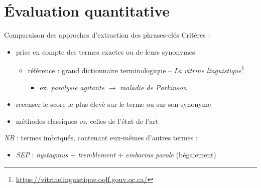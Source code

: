 \documentclass[xcolor={table,usenames,dvipsnames}]{beamer}
\let\olditem\item
\renewcommand{\item}{%
\olditem\vspace{0pt}}
\begin{document}
\section[Évaluation quantitative]{Évaluation quantitative}
\begin{frame}{Comparaison des approches d'extraction des phrases-clés}
	Critères :
	\begin{itemize}
		\item prise en compte des termes exactes ou de leurs synonymes
		\begin{itemize}
			\item référence : grand dictionnaire terminologique -- \textit{La vitrine linguistique}\footnote{\url{https://vitrinelinguistique.oqlf.gouv.qc.ca/}}
				\begin{itemize}
					\item ex. \textit{paralysie agitante} $\rightarrow$ \textit{maladie de Parkinson}
				\end{itemize}
		\end{itemize}
					\item recenser le score le plus élevé sur le terme ou sur son synonyme
					\item méthodes classiques \textit{vs.} celles de l'état de l'art
	\end{itemize}
	
	\textit{NB} : termes \og{}imbriqués\fg{}, contenant eux-mêmes d'autres termes :
	\begin{itemize}
		\item \textit{SEP} : \textit{nystagmus} + \textit{tremblement} + \textit{embarras parole} (bégaiement)
	\end{itemize}
	\end{frame}
	
\end{document}

